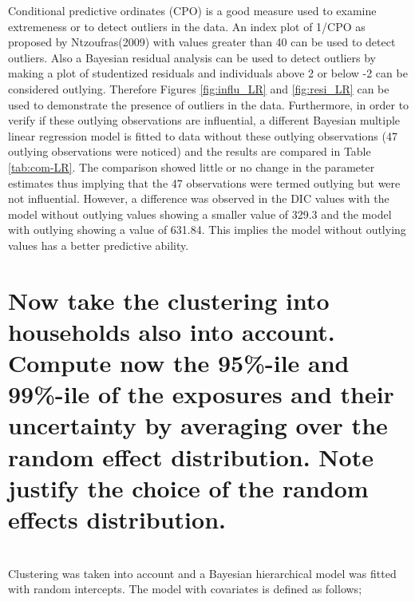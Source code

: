 \documentclass[11pt]{article}
\begin{document}
Conditional predictive ordinates (CPO) is a good measure used to examine extremeness or to detect outliers in the data. An index plot of 1/CPO as proposed by Ntzoufras(2009) with values greater than 40 can be used to detect outliers. Also a Bayesian residual analysis can be used to detect outliers by making a plot of studentized residuals and individuals above 2 or below -2 can be considered outlying. Therefore Figures \ref{fig:influ_LR} and \ref{fig:resi_LR}  can be used to demonstrate the presence of outliers in the data. Furthermore, in order to verify if these outlying observations are influential, a different Bayesian multiple linear regression model is fitted to data without these outlying observations (47 outlying observations were noticed) and the results are compared in Table \ref{tab:com-LR}. The comparison showed little or no change in the parameter estimates thus implying that the 47 observations were termed outlying but were not influential. However, a difference was observed in the DIC values with the model without outlying values showing a smaller value of 329.3 and the model with outlying showing a value of 631.84. This implies the model without outlying values has a better predictive ability. 
 

\newpage
\section{Now take the clustering into households also into account. Compute now the 95\%-ile and 99\%-ile of the exposures and their uncertainty by averaging over the random effect distribution. Note justify the choice of the random effects distribution.}
\\
Clustering was taken into account and a Bayesian hierarchical model was fitted with random intercepts. The model with covariates is defined as follows;
\end{document}
